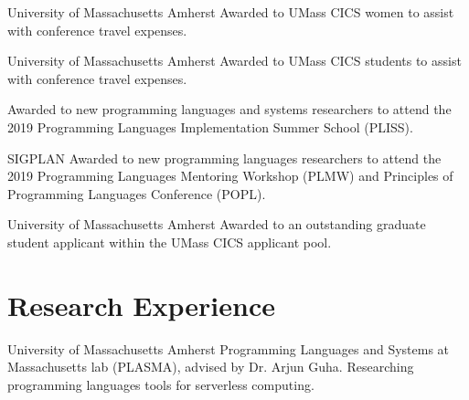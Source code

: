 \documentclass[10pt,letterpaper]{moderncv} %
\begin{document}
%
{University of Massachusetts Amherst}%
{}%
{}%
{Awarded to UMass CICS women to assist with conference travel expenses.
\newline{}
}

%
{University of Massachusetts Amherst}%
{}%
{}%
{Awarded to UMass CICS students to assist with conference travel expenses.
\newline{}
}

%
{}%
{}%
{}%
{Awarded to new programming languages and systems researchers to attend the 2019
Programming Languages Implementation Summer School (PLISS).
\newline{}
}

%
{SIGPLAN}%
{}%
{}%
{Awarded to new programming languages researchers to attend the 2019 Programming
Languages Mentoring Workshop (PLMW) and Principles of Programming Languages
Conference (POPL).
\newline{}
}

%
{University of Massachusetts Amherst}%
{}%
{}%
{Awarded to an outstanding graduate student applicant within the UMass CICS
applicant pool.
}


\section{Research Experience}

%
{University of Massachusetts Amherst}%
{}%
{}%
{Programming Languages and Systems at Massachusetts lab (PLASMA), advised by Dr.
Arjun Guha. Researching programming languages tools for serverless computing.
%
\newline{}
}
\end{document}
